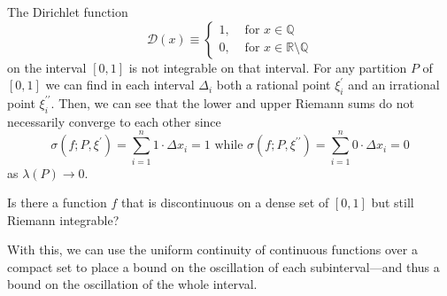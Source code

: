   \begin{example}
    The Dirichlet function
    \begin{equation}
      \mathcal{D}(x) \equiv \begin{cases}
        1, & \text{ for } x \in \mathbb{Q} \\
        0, & \text{ for } x \in \mathbb{R} \setminus \mathbb{Q}
      \end{cases}
    \end{equation}
    on the interval $[0,1]$ is not integrable on that interval. For any partition $P$ of $[0,1]$ we can find in each interval $\Delta_i$ both a rational point $\xi^\prime_i$ and an irrational point $\xi_i^{\prime\prime}$. Then, we can see that the lower and upper Riemann sums do not necessarily converge to each other since
    \begin{equation}
      \sigma(f; P, \xi^\prime) = \sum_{i=1}^n 1 \cdot \Delta x_i = 1 \text{ while } \sigma(f;P, \xi^{\prime\prime}) = \sum_{i=1}^n 0 \cdot \Delta x_i = 0
    \end{equation}
    as $\lambda(P) \rightarrow 0$. 
  \end{example}

  \begin{example}
    Is there a function $f$ that is discontinuous on a dense set of $[0, 1]$ but still Riemann integrable? 
  \end{example}

  With this, we can use the uniform continuity of continuous functions over a compact set to place a bound on the oscillation of each subinterval---and thus a bound on the oscillation of the whole interval. 

